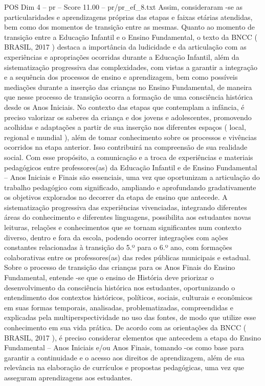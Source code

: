 \begin{textsample}{POS Dim 4 – pr – Score 11.00 – pr/pr\_ef\_8.txt}
Assim, consideraram -se as particularidades e aprendizagens próprias das etapas e faixas etárias atendidas, bem como dos momentos de transição entre as mesmas.
Quanto ao momento de transição entre a Educação Infantil e o Ensino Fundamental, o texto da BNCC ( BRASIL, 2017 ) destaca a importância da ludicidade e da articulação com as experiências e apropriações ocorridas durante a Educação Infantil, além da sistematização progressiva das complexidades, com vistas a garantir a integração e a sequência dos processos de ensino e aprendizagem, bem como possíveis mediações durante a inserção das crianças no Ensino Fundamental, de maneira que nesse processo de transição ocorra a formação de uma consciência histórica desde os Anos Iniciais.
No contexto das etapas que contemplam a infância, é preciso valorizar os saberes da criança e dos jovens e adolescentes, promovendo acolhidas e adaptações a partir de sua inserção nos diferentes espaços ( local, regional e mundial ), além de tomar conhecimento sobre os processos e vivências ocorridos na etapa anterior.
Isso contribuirá na compreensão de sua realidade social.
Com esse propósito, a comunicação e a troca de experiências e materiais pedagógicos entre professores(as) da Educação Infantil e de Ensino Fundamental – Anos Iniciais e Finais são essenciais, uma vez que oportunizam a articulação do trabalho pedagógico com significado, ampliando e aprofundando gradativamente os objetivos explorados no decorrer da etapa de ensino que antecede.
A sistematização progressiva das experiências vivenciadas, integrando diferentes áreas do conhecimento e diferentes linguagens, possibilita aos estudantes novas leituras, relações e conhecimentos que se tornam significantes num contexto diverso, dentro e fora da escola, podendo ocorrer integrações com ações constantes relacionadas à transição do 5.º para o 6.º ano, com formações colaborativas entre os professores(as) das redes públicas municipais e estadual.
Sobre o processo de transição das crianças para os Anos Finais do Ensino Fundamental, entende -se que o ensino de História deve priorizar o desenvolvimento da consciência histórica nos estudantes, oportunizando o entendimento dos contextos históricos, políticos, sociais, culturais e econômicos em suas formas temporais, analisadas, problematizadas, compreendidas e explicadas pela multiperspectividade no uso das fontes, de modo que utilize esse conhecimento em sua vida prática.
De acordo com as orientações da BNCC ( BRASIL, 2017 ), é preciso considerar elementos que antecedem a etapa do Ensino Fundamental – Anos Iniciais e/ou Anos Finais, tomando -os como base para garantir a continuidade e o acesso aos direitos de aprendizagem, além de sua relevância na elaboração de currículos e propostas pedagógicas, uma vez que asseguram aprendizagens aos estudantes.

\end{textsample}
